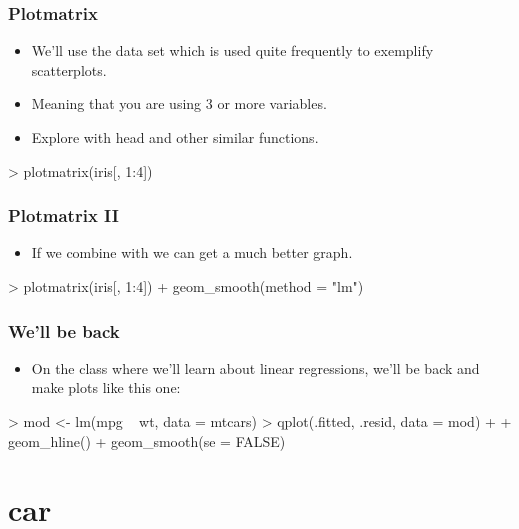 \begin{frame}
  \frametitle{Plotmatrix}
  \begin{itemize}
  \item We'll use the  data set which is used quite frequently to exemplify scatterplots.
  \item Meaning that you are using 3 or more variables.
  \item Explore  with head and other similar functions.
  \end{itemize}
\begin{Schunk}
\begin{Sinput}
> plotmatrix(iris[, 1:4])
\end{Sinput}
\end{Schunk}
\end{frame}

\begin{frame}
  \frametitle{Plotmatrix II}
  \begin{itemize}
  \item If we combine  with  we can get a much better graph.
  \end{itemize}
\begin{Schunk}
\begin{Sinput}
> plotmatrix(iris[, 1:4]) + geom_smooth(method = "lm")
\end{Sinput}
\end{Schunk}
\end{frame}

\begin{frame}
  \frametitle{We'll be back}
  \begin{itemize}
  \item On the class where we'll learn about linear regressions, we'll be back and make plots like this one:
  \end{itemize}
\begin{Schunk}
\begin{Sinput}
> mod <- lm(mpg ~ wt, data = mtcars)
> qplot(.fitted, .resid, data = mod) + 
+     geom_hline() + geom_smooth(se = FALSE)
\end{Sinput}
\end{Schunk}
\end{frame}

\section{car}

